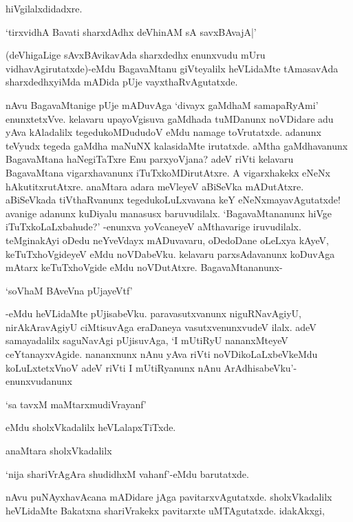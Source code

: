 hiVgilalxdidadxre.

\begin{shloka}
`tirxvidhA Bavati sharxdAdhx deVhinAM sA savxBAvajA|'
\end{shloka} 

(deVhigaLige sAvxBAvikavAda sharxdedhx enunxvudu mUru vidhavAgirutatxde)-eMdu BagavaMtanu giVteyalilx heVLidaMte tAmasavAda sharxdedhxyiMda mADida pUje vayxthaRvAgutatxde.

nAvu BagavaMtanige pUje mADuvAga `divayx gaMdhaM samapaRyAmi' enunxtetxVve. kelavaru upayoVgisuva gaMdhada tuMDanunx noVDidare adu yAva kAladalilx tegedukoMDududoV eMdu namage toVrutatxde. adanunx teVyudx tegeda gaMdha maNuNX kalasidaMte irutatxde. aMtha gaMdhavanunx BagavaMtana haNegiTaTxre Enu parxyoVjana? adeV riVti kelavaru BagavaMtana vigarxhavanunx iTuTxkoMDirutAtxre. A vigarxhakekx eNeNx hAkutitxrutAtxre. anaMtara adara meVleyeV aBiSeVka mADutAtxre. aBiSeVkada tiVthaRvanunx tegedukoLuLxvavana keY eNeNxmayavAgutatxde! avanige adanunx kuDiyalu manasusx baruvudilalx. `BagavaMtananunx hiVge iTuTxkoLaLxbahude?' -enunxva yoVcaneyeV aMthavarige iruvudilalx. teMginakAyi oDedu neYveVdayx mADuvavaru, oDedoDane oLeLxya kAyeV, keTuTxhoVgideyeV eMdu noVDabeVku. kelavaru parxsAdavanunx koDuvAga mAtarx keTuTxhoVgide eMdu noVDutAtxre. BagavaMtananunx-

\begin{shloka}
`soV\s haM BAveVna pUjayeVtf'
\end{shloka}

-eMdu heVLidaMte pUjisabeVku. paravasutxvanunx niguRNavAgiyU, nirAkAravAgiyU ciMtisuvAga eraDaneya vasutxvenunxvudeV ilalx. adeV samayadalilx saguNavAgi pUjisuvAga, `I mUtiRyU nananxMteyeV ceYtanayxvAgide. nananxnunx nAnu yAva riVti noVDikoLaLxbeVkeMdu koLuLxtetxVnoV adeV riVti I mUtiRyanunx nAnu ArAdhisabeVku'-enunxvudanunx

\begin{shloka}
`sa tavxM maMtarxmudiVrayanf'
\end{shloka}

eMdu sholxVkadalilx heVLalapxTiTxde.

anaMtara sholxVkadalilx 

\begin{shloka}
`nija shariVrAgAra shudidhxM vahanf'-eMdu barutatxde.
\end{shloka}

nAvu puNAyxhavAcana mADidare jAga pavitarxvAgutatxde. sholxVkadalilx heVLidaMte Bakatxna shariVrakekx pavitarxte uMTAgutatxde. idakAkxgi,

